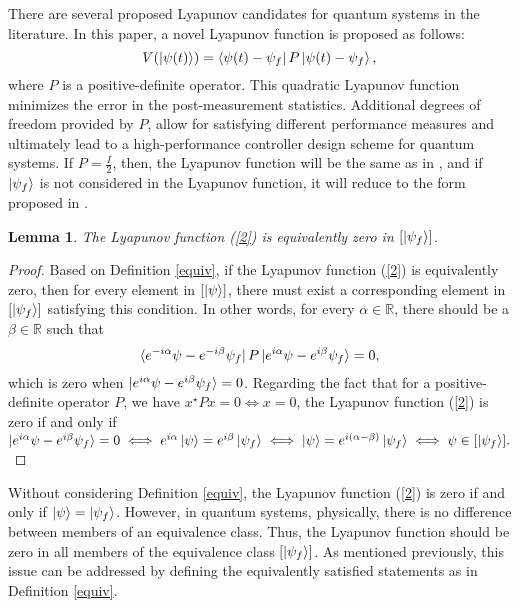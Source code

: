 \documentclass[journal]{IEEEtran}
\newtheorem{lemma}[theorem]{Lemma}
\theoremstyle{definition}
\begin{document}
There are several proposed Lyapunov candidates for quantum systems in the literature. In this paper, a novel Lyapunov function is proposed as follows:
\begin{equation}\label{2}
  V(\ket{\psi(t)})=\bra{\psi{(t)}-\psi_f}P\ket{\psi{(t)}-\psi_f},
\end{equation}
where $P$ is a positive-definite operator. This quadratic Lyapunov function minimizes the error in the post-measurement statistics. Additional degrees of freedom provided by $P$, allow for satisfying different performance measures and ultimately lead to a high-performance controller design scheme for quantum systems. If $P=\frac{I}{2}$, then, the Lyapunov function will be the same as in \cite{kuang2008lyapunov}, and if $\ket{\psi_f}$ is not considered in the Lyapunov function, it will reduce to the form proposed in \cite{grivopoulos2003lyapunov}.

\begin{lemma}\label{Lya}
The Lyapunov function (\ref{2}) is equivalently zero in $[\ket{\psi_f}]$.
\end{lemma}
\begin{proof}
Based on Definition \ref{equiv}, if the Lyapunov function (\ref{2}) is equivalently zero, then for every element in $[\ket{\psi}]$, there must exist a corresponding element in $[\ket{\psi_f}]$ satisfying this condition. In other words, for every $\alpha \in \mathbb{R}$, there should be a $\beta \in \mathbb{R}$ such that
$$
 \bra{e^{-i\alpha}\psi-e^{-i\beta}\psi_f}P\ket{e^{i\alpha}\psi-e^{i\beta}\psi_f}=0,
$$ 
which is zero when $\ket{e^{i\alpha}\psi-e^{i\beta}\psi_f}=0$. Regarding the fact that for a positive-definite operator $P$, we have $x^{\star}P x=0\iff x=0$, the Lyapunov function (\ref{2}) is zero if and only if 
\\
$\ket{e^{i\alpha}\psi-e^{i\beta}\psi_f}=0\iff {e^{i\alpha}}\ket\psi={e^{i\beta}\ket{\psi_f}}\iff \ket\psi= {e^{i(\alpha-\beta)}}\ket{\psi_f}\iff \psi \in [\ket{\psi_f}]. $ 
\end{proof}

Without considering Definition \ref{equiv}, the Lyapunov function (\ref{2}) is zero if and only if $\ket{\psi}=\ket{\psi_f}$. However, in quantum systems, physically, there is no difference between members of an equivalence class. Thus, the Lyapunov function should be zero in all members of the equivalence class $[\ket{\psi_f}]$. As mentioned previously, this issue can be addressed by defining the equivalently satisfied statements as in Definition \ref{equiv}. 
\end{document}
